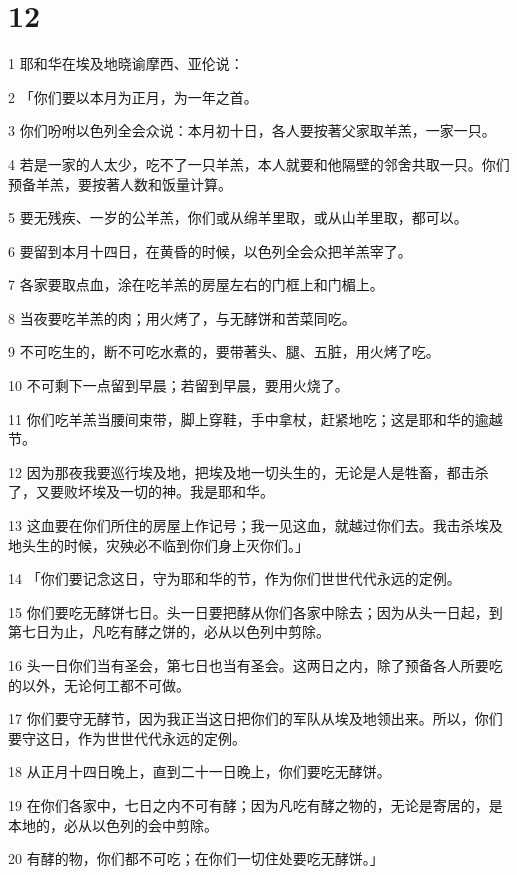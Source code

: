 \chapter{12}

\par 1 耶和华在埃及地晓谕摩西、亚伦说：
\par 2 「你们要以本月为正月，为一年之首。
\par 3 你们吩咐以色列全会众说：本月初十日，各人要按著父家取羊羔，一家一只。
\par 4 若是一家的人太少，吃不了一只羊羔，本人就要和他隔壁的邻舍共取一只。你们预备羊羔，要按著人数和饭量计算。
\par 5 要无残疾、一岁的公羊羔，你们或从绵羊里取，或从山羊里取，都可以。
\par 6 要留到本月十四日，在黄昏的时候，以色列全会众把羊羔宰了。
\par 7 各家要取点血，涂在吃羊羔的房屋左右的门框上和门楣上。
\par 8 当夜要吃羊羔的肉；用火烤了，与无酵饼和苦菜同吃。
\par 9 不可吃生的，断不可吃水煮的，要带著头、腿、五脏，用火烤了吃。
\par 10 不可剩下一点留到早晨；若留到早晨，要用火烧了。
\par 11 你们吃羊羔当腰间束带，脚上穿鞋，手中拿杖，赶紧地吃；这是耶和华的逾越节。
\par 12 因为那夜我要巡行埃及地，把埃及地一切头生的，无论是人是牲畜，都击杀了，又要败坏埃及一切的神。我是耶和华。
\par 13 这血要在你们所住的房屋上作记号；我一见这血，就越过你们去。我击杀埃及地头生的时候，灾殃必不临到你们身上灭你们。」
\par 14 「你们要记念这日，守为耶和华的节，作为你们世世代代永远的定例。
\par 15 你们要吃无酵饼七日。头一日要把酵从你们各家中除去；因为从头一日起，到第七日为止，凡吃有酵之饼的，必从以色列中剪除。
\par 16 头一日你们当有圣会，第七日也当有圣会。这两日之内，除了预备各人所要吃的以外，无论何工都不可做。
\par 17 你们要守无酵节，因为我正当这日把你们的军队从埃及地领出来。所以，你们要守这日，作为世世代代永远的定例。
\par 18 从正月十四日晚上，直到二十一日晚上，你们要吃无酵饼。
\par 19 在你们各家中，七日之内不可有酵；因为凡吃有酵之物的，无论是寄居的，是本地的，必从以色列的会中剪除。
\par 20 有酵的物，你们都不可吃；在你们一切住处要吃无酵饼。」
